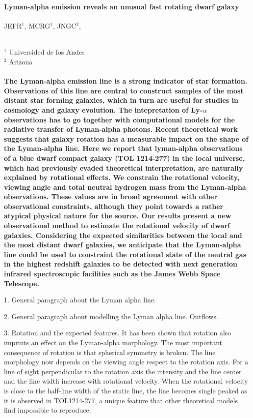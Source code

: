 \documentclass[a4paper, usenatbib, 12pt]{article}
\newcommand{\tol}{TOL1214-277}
\begin{document}
\pagestyle{empty}
\noindent
\textbf{Lyman-alpha emission reveals an unusual fast rotating dwarf galaxy}  
\\
\\
JEFR$^{1}$, MCRG$^1$, JNGC$^2$,
\\
\\
\scriptsize
{$^1$ Universided de los Andes
\\
$^2$ Arizona
\normalsize
\\
\\
\textbf{The Lyman-alpha emission line is a strong indicator of star formation.
Observations of this line are central to construct samples of the most
distant star forming galaxies, which in turn are useful for studies in
cosmology and galaxy evolution.  
The intepretation of Ly-$\alpha$ observations has to go together with
computational models for the radiative transfer of Lyman-alpha photons.
Recent theoretical work suggests that galaxy rotation has a measurable
impact on the shape of the Lyman-alpha line.  
Here we report that lyman-alpha observations of a blue dwarf compact galaxy (TOL
1214-277) in the local universe, which had previously evaded theoretical 
interpretation, are naturally explained by rotational effects.
We constrain the rotational velocity, viewing angle and total
neutral hydrogen mass from the Lyman-alpha observations.
These values are in broad agreement with other observational
constraints, although  they point towards a rather atypical physical
nature for the source.  
Our results present a new observational method to estimate the rotational
velocity of dwarf galaxies.
Considering the expected similarities between the local and the most
distant dwarf galaxies, we anticipate that the Lyman-alpha line could be
used to constraint the rotational state of the neutral gas in the
highest redshift galaxies to be detected with next generation infrared
spectroscopic facilities such as the James Webb Space Telescope.}




1. General paragraph about the Lyman alpha line.

2. General paragraph about modelling the Lyman alpha
line. Outflows.

3. Rotation and the expected features.
It has been shown that rotation also imprints an effect on the
Lyman-alpha morphology. 
The most important consequence of rotation is that spherical 
symmetry is broken.
The line morphology now depends on the viewing angle respect to the
rotation axis.  
For a line of sight perpendicular to the rotation axis the intensity and
the line center and the line width increase with rotational velocity. 
When the rotational velocity is close to the half-line width of the
static line, the line becomes single peaked as it is observed in
\tol, a unique feature that other theoretical models find
impossible to reproduce.



}
\end{document}
